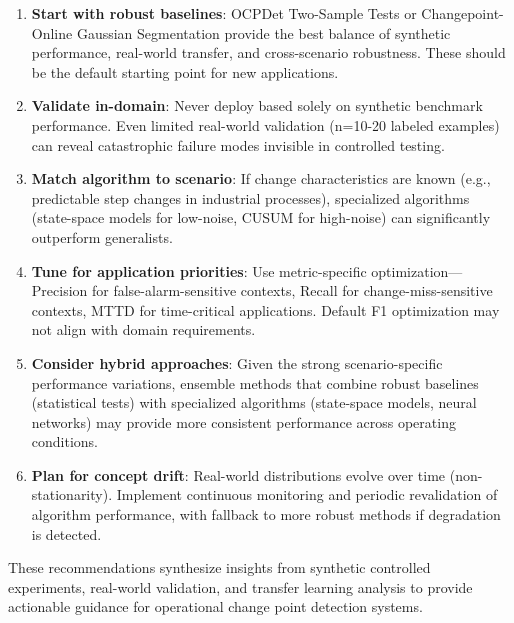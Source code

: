 \begin{enumerate}
    \item \textbf{Start with robust baselines}: OCPDet Two-Sample Tests or Changepoint-Online Gaussian Segmentation provide the best balance of synthetic performance, real-world transfer, and cross-scenario robustness. These should be the default starting point for new applications.
    
    \item \textbf{Validate in-domain}: Never deploy based solely on synthetic benchmark performance. Even limited real-world validation (n=10-20 labeled examples) can reveal catastrophic failure modes invisible in controlled testing.
    
    \item \textbf{Match algorithm to scenario}: If change characteristics are known (e.g., predictable step changes in industrial processes), specialized algorithms (state-space models for low-noise, CUSUM for high-noise) can significantly outperform generalists.
    
    \item \textbf{Tune for application priorities}: Use metric-specific optimization—Precision for false-alarm-sensitive contexts, Recall for change-miss-sensitive contexts, MTTD for time-critical applications. Default F1 optimization may not align with domain requirements.
    
    \item \textbf{Consider hybrid approaches}: Given the strong scenario-specific performance variations, ensemble methods that combine robust baselines (statistical tests) with specialized algorithms (state-space models, neural networks) may provide more consistent performance across operating conditions.
    
    \item \textbf{Plan for concept drift}: Real-world distributions evolve over time (non-stationarity). Implement continuous monitoring and periodic revalidation of algorithm performance, with fallback to more robust methods if degradation is detected.
\end{enumerate}

These recommendations synthesize insights from synthetic controlled experiments, real-world validation, and transfer learning analysis to provide actionable guidance for operational change point detection systems.
